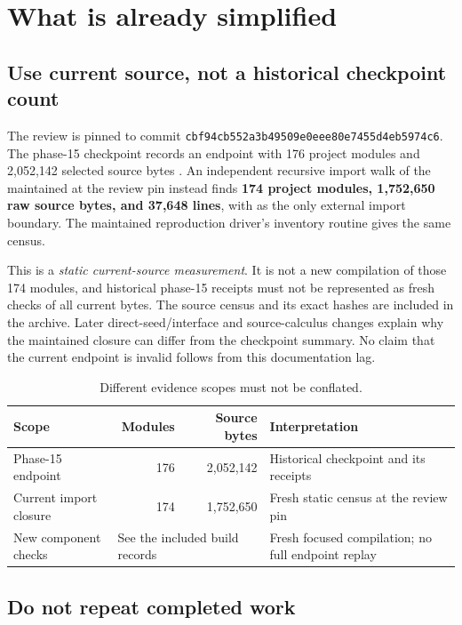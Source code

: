 \documentclass[11pt,letterpaper]{article}
\theoremstyle{definition}
\newcommand{\code}[1]{\texttt{\detokenize{#1}}}
\begin{document}
\section{What is already simplified}
\label{sec:baseline}

\subsection{Use current source, not a historical checkpoint count}

The review is pinned to commit
\nolinkurl{cbf94cb552a3b49509e0eee80e7455d4eb5974c6}.
The phase-15 checkpoint records an endpoint with 176 project modules and
2,052,142 selected source bytes \cite{phase15}. An independent recursive import
walk of the maintained \code{KEndpoint215} at the review pin instead finds
\textbf{174 project modules, 1,752,650 raw source bytes, and 37,648 lines}, with
\code{Init} as the only external import boundary. The maintained reproduction
driver's inventory routine gives the same census.

This is a \emph{static current-source measurement}. It is not a new compilation
of those 174 modules, and historical phase-15 receipts must not be represented
as fresh checks of all current bytes. The source census and its exact hashes
are included in the archive. Later direct-seed/interface and source-calculus
changes explain why the maintained closure can differ from the checkpoint
summary. No claim that the current endpoint is invalid follows from this
documentation lag.

\begin{table}[ht]
\centering\small
\begin{tabularx}{\textwidth}{@{}lrrX@{}}
\toprule
Scope & Modules & Source bytes & Interpretation\\
\midrule
Phase-15 endpoint & 176 & 2,052,142 & Historical checkpoint and its receipts\\
Current import closure & 174 & 1,752,650 & Fresh static census at the review pin\\
New component checks & \multicolumn{2}{l}{See the included build records} & Fresh focused compilation; no full endpoint replay\\
\bottomrule
\end{tabularx}
\caption{Different evidence scopes must not be conflated.}
\end{table}

\subsection{Do not repeat completed work}
\end{document}
